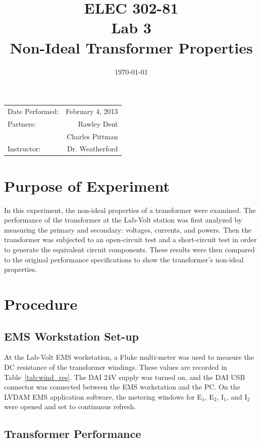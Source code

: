 \documentclass{article}
\title{ELEC 302-81\\ Lab 3\\ Non-Ideal Transformer Properties} %
\date{\today} %
\begin{document}
\maketitle

\begin{center}
  \begin{tabular}{lr}
    Date Performed: & February 4, 2013 \\
    Partners: & Rawley Dent \\
              & Charles Pittman \\
    Instructor: & Dr. Weatherford
  \end{tabular}
\end{center}

\pagebreak


\section{Purpose of Experiment}

In this experiment, the non-ideal properties of a transformer were examined.
The performance of the transformer at the Lab-Volt station was first analyzed
by measuring the primary and secondary: voltages, currents, and powers. Then
the transformer was subjected to an open-circuit test and a short-circuit test
in order to generate the equivalent circuit components. These results were then
compared to the original performance specifications to show the transformer's
non-ideal properties.

\section{Procedure}

\subsection{EMS Workstation Set-up}

At the Lab-Volt EMS workstation, a Fluke multi-meter was used to measure the DC
resistance of the transformer windings. These values are recorded in
Table~\ref{tab:wind_res}.  The DAI 24V supply was turned on, and the DAI USB
connector was connected between the EMS workstation and the {PC}. On the LVDAM
EMS application software, the metering windows for E$_1$, E$_2$, I$_1$, and
I$_2$ were opened and set to continuous refresh.

\subsection{Transformer Performance}
\end{document}

